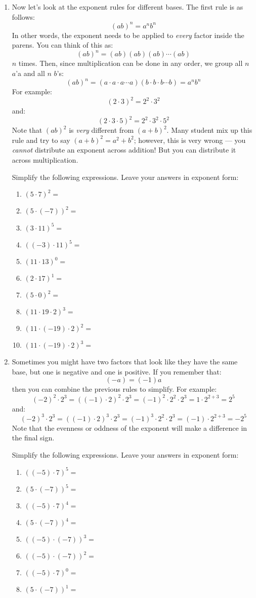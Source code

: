 \documentclass[letterpaper,12pt,fleqn]{article}
\begin{document}
\begin{enumerate}
\item Now let's look at the exponent rules for different bases. The first rule
  is as follows:
  \[(ab)^n=a^nb^n\]
  In other words, the exponent needs to be applied to \emph{every} factor
  inside the parens. You can think of this as:
  \[(ab)^n=(ab)(ab)(ab)\cdots(ab)\]
  $n$ times. Then, since multiplication can be done in any order, we group all
  $n$ $a$'a and all $n$ $b$'s:
  \[(ab)^n=(a\cdot a\cdot a\cdots a)(b\cdot b\cdot b\cdots b)=a^nb^n\]
  For example:
  \[(2\cdot3)^2=2^2\cdot3^2\]
  and:
  \[(2\cdot3\cdot5)^2=2^2\cdot3^2\cdot5^2\]
  Note that $(ab)^2$ is \emph{very} different from $(a+b)^2$. Many student mix
  up this rule and try to say $(a+b)^2=a^2+b^2$; however, this is very wrong
  --- you \emph{cannot} distribute an exponent across addition! But you can
  distribute it across multiplication.

  Simplify the following expressions. Leave your answers in exponent form:
  \begin{enumerate}
  \item $(5\cdot7)^2=$
  \item $(5\cdot(-7))^2=$
  \item $(3\cdot11)^5=$
  \item $((-3)\cdot11)^5=$
  \item $(11\cdot13)^0=$
  \item $(2\cdot17)^1=$
  \item $(5\cdot0)^2=$
  \item $(11\cdot19\cdot2)^3=$
  \item $(11\cdot(-19)\cdot2)^2=$
  \item $(11\cdot(-19)\cdot2)^3=$
  \end{enumerate}
  
\item Sometimes you might have two factors that look like they have the same
  base, but one is negative and one is positive. If you remember that:
  \[(-a)=(-1)a\]
  then you can combine the previous rules to simplify. For example:
  \[(-2)^2\cdot2^3=((-1)\cdot2)^2\cdot2^3=(-1)^2\cdot2^2\cdot2^3=
  1\cdot2^{2+3}=2^5\]
  and:
  \[(-2)^3\cdot2^3=((-1)\cdot2)^3\cdot2^3=(-1)^3\cdot2^2\cdot2^3=
  (-1)\cdot2^{2+3}=-2^5\]
  Note that the evenness or oddness of the exponent will make a difference in
  the final sign.

  Simplify the following expressions. Leave your answers in exponent form:
  \begin{enumerate}
  \item $((-5)\cdot7)^5=$
  \item $(5\cdot(-7))^5=$
  \item $((-5)\cdot7)^4=$
  \item $(5\cdot(-7))^4=$
  \item $((-5)\cdot(-7))^3=$
  \item $((-5)\cdot(-7))^2=$
  \item $((-5)\cdot7)^0=$
  \item $(5\cdot(-7))^1=$
  \end{enumerate}


\end{enumerate}
\end{document}
